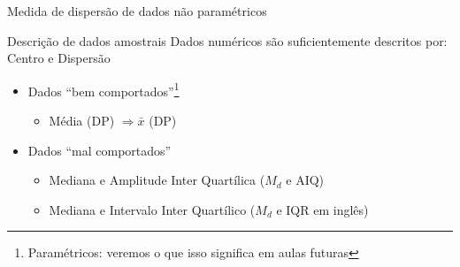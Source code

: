 \documentclass{beamer}
\begin{document}
\begin{frame}{\scriptsize Medida de dispersão de dados não paramétricos}
  \begin{block}{Descrição de dados amostrais}
    \scriptsize
    Dados numéricos são suficientemente descritos por: Centro e Dispersão

    \bigskip
    \begin{itemize}
      \footnotesize
    \item Dados ``bem comportados''\footnote{\tiny Paramétricos: veremos o que isso significa em aulas futuras}
      \begin{itemize}
        \scriptsize
      \item Média (DP) $\Rightarrow \bar{x}$ (DP)
      \end{itemize}
      \bigskip
    \item Dados ``mal comportados''
      \begin{itemize}
        \scriptsize
      \item Mediana e Amplitude Inter Quartílica ($M_d$ e AIQ)
      \item Mediana e Intervalo Inter Quartílico ($M_d$ e IQR {\tiny em inglês})
      \end{itemize}
    \end{itemize}
  \end{block}
\end{frame}
\end{document}
